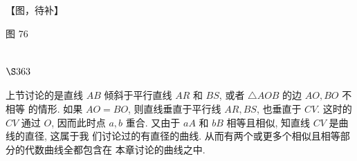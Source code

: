 【图，待补】

图 76

\section{$\S 363$}

上节讨论的是直线 $A B$ 倾斜于平行直线 $A R$ 和 $B S$, 或者 $\triangle A O B$ 的边 $A O, B O$ 不相等 的情形. 如果 $A O=B O$, 则直线垂直于平行线 $A R, B S$, 也垂直于 $C V$. 这时的 $C V$ 通过 $O$, 因而此时点 $a, b$ 重合. 又由于 $a A$ 和 $b B$ 相等且相似, 知直线 $C V$ 是曲线的直径, 这属于我 们讨论过的有直径的曲线. 从而有两个或更多个相似且相等部分的代数曲线全都包含在 本章讨论的曲线之中. 

